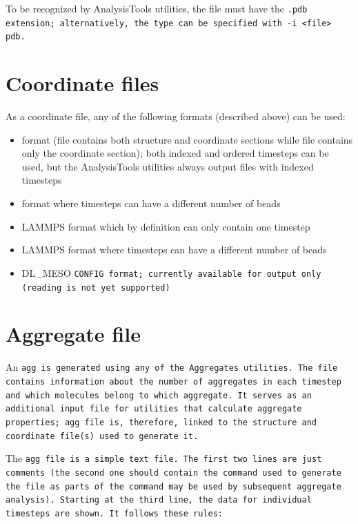 To be recognized by AnalysisTools utilities, the file must have the \tt{.pdb}
extension; alternatively, the type can be specified with \tt{-i <file> pdb}. %

\section{Coordinate files}\label{sec:CoorFile}
As a coordinate file, any of the following formats (described above) can be
used:
\begin{itemize}
  \item \vtcf format (\vtf file contains both structure and coordinate sections
    while \vcf file contains only the coordinate section); both indexed and
    ordered timesteps can be used, but the AnalysisTools utilities always output
    files with indexed timesteps
  \item \xyz format where timesteps can have a different number of beads
  \item LAMMPS \data format which by definition can only contain one timestep
  \item LAMMPS \ltrj format where timesteps can have a different number of beads
  \item DL\_MESO \tt{CONFIG} format; currently available for output only (reading
    is not yet supported)
\end{itemize}

\section{Aggregate file} \label{sec:AggFile} %

An \tt{agg} is generated using any of the \tt{Aggregates} utilities. The file
contains information about the number of aggregates in each timestep and which
molecules
belong to which aggregate. It serves as an additional input file for utilities
that calculate aggregate properties; \tt{agg} file is, therefore, linked to the
structure and coordinate file(s) used to generate it.

The \tt{agg} file is a simple text file. The first two lines are just comments
(the second one should contain the command used to generate the file as parts of
the command may be used by subsequent aggregate analysis). Starting at the third
line, the data for individual timesteps are shown. It follows these rules:

